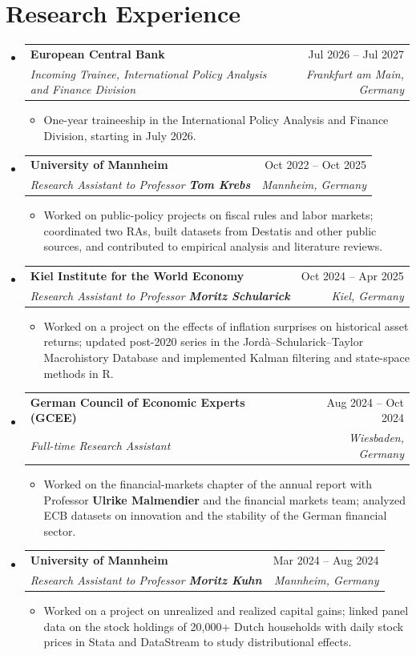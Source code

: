 \documentclass[a4paper,10pt]{article}
\makeatletter
\newcommand{\resumeItem}[1]{
  \item\small{{#1 \vspace{-2pt}}}
}
\newcommand{\profname}[1]{{\bfseries\normalsize #1}}
\newcommand{\resumeSubheading}[4]{
  \vspace{-2pt}\item
    \begin{tabular*}{0.97\textwidth}[t]{l@{\extracolsep{\fill}}r}
      \textbf{#1} & #2 \\
      \textit{\small #3} & \textit{\small #4} \\
    \end{tabular*}\vspace{-7pt}
}
\newcommand{\resumeSubHeadingListStart}{\begin{itemize}[leftmargin=0.15in, label={}]}
\newcommand{\resumeSubHeadingListEnd}{\end{itemize}}
\newcommand{\resumeItemListStart}{\begin{itemize}[leftmargin=0.2in, itemsep=1pt, parsep=0pt, topsep=2pt]}
\newcommand{\resumeItemListEnd}{\end{itemize}\vspace{-6pt}}
\makeatother
\begin{document}
\section{Research Experience}
  \resumeSubHeadingListStart
    \resumeSubheading
      {European Central Bank}{Jul 2026 -- Jul 2027}
      {Incoming Trainee, International Policy Analysis and Finance Division}{Frankfurt am Main, Germany}
      \resumeItemListStart
        \resumeItem{One-year traineeship in the International Policy Analysis and Finance Division, starting in July 2026.}
      \resumeItemListEnd

    \resumeSubheading
      {University of Mannheim}{Oct 2022 -- Oct 2025}
      {Research Assistant to Professor \profname{Tom Krebs}}{Mannheim, Germany}
      \resumeItemListStart
        \resumeItem{Worked on public-policy projects on fiscal rules and labor markets; coordinated two RAs, built datasets from Destatis and other public sources, and contributed to empirical analysis and literature reviews.}
      \resumeItemListEnd

    \resumeSubheading
      {Kiel Institute for the World Economy}{Oct 2024 -- Apr 2025}
      {Research Assistant to Professor \profname{Moritz Schularick}}{Kiel, Germany}
      \resumeItemListStart
        \resumeItem{Worked on a project on the effects of inflation surprises on historical asset returns; updated post-2020 series in the Jord\`a--Schularick--Taylor Macrohistory Database and implemented Kalman filtering and state-space methods in R.}
      \resumeItemListEnd

    \resumeSubheading
      {German Council of Economic Experts (GCEE)}{Aug 2024 -- Oct 2024}
      {Full-time Research Assistant}{Wiesbaden, Germany}
      \resumeItemListStart
        \resumeItem{Worked on the financial-markets chapter of the annual report with Professor \profname{Ulrike Malmendier} and the financial markets team; analyzed ECB datasets on innovation and the stability of the German financial sector.}
      \resumeItemListEnd

    \resumeSubheading
      {University of Mannheim}{Mar 2024 -- Aug 2024}
      {Research Assistant to Professor \profname{Moritz Kuhn}}{Mannheim, Germany}
      \resumeItemListStart
        \resumeItem{Worked on a project on unrealized and realized capital gains; linked panel data on the stock holdings of 20,000+ Dutch households with daily stock prices in Stata and DataStream to study distributional effects.}
      \resumeItemListEnd
  \resumeSubHeadingListEnd
\end{document}
